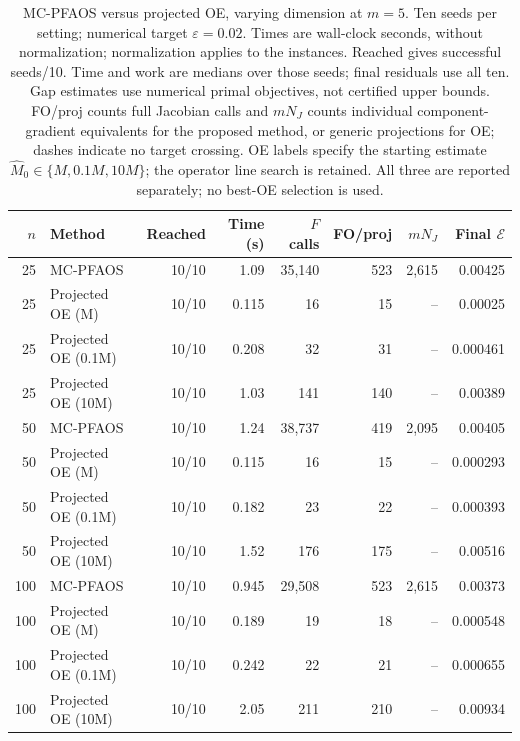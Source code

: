 \begin{table}[!htbp]
\centering\scriptsize
\caption{MC-PFAOS versus projected OE, varying dimension at $m=5$. Ten seeds per setting; numerical target $\varepsilon=0.02$. Times are wall-clock seconds, without normalization; normalization applies to the instances. Reached gives successful seeds/10. Time and work are medians over those seeds; final residuals use all ten. Gap estimates use numerical primal objectives, not certified upper bounds. FO/proj counts full Jacobian calls and $mN_J$ counts individual component-gradient equivalents for the proposed method, or generic projections for OE; dashes indicate no target crossing. OE labels specify the starting estimate $\widehat M_0\in\{M,0.1M,10M\}$; the operator line search is retained. All three are reported separately; no best-OE selection is used.}
\label{tab:mc_dimension_numerical}
\begin{tabular}{r l r r r r r r}
\hline
$n$ & Method & Reached & Time (s) & $F$ calls & FO/proj & $mN_J$ & Final $\mathcal E$ \\
\hline
25 & MC-PFAOS & 10/10 & 1.09 & 35,140 & 523 & 2,615 & 0.00425 \\
25 & Projected OE (M) & 10/10 & 0.115 & 16 & 15 & -- & 0.00025 \\
25 & Projected OE (0.1M) & 10/10 & 0.208 & 32 & 31 & -- & 0.000461 \\
25 & Projected OE (10M) & 10/10 & 1.03 & 141 & 140 & -- & 0.00389 \\
\hline
50 & MC-PFAOS & 10/10 & 1.24 & 38,737 & 419 & 2,095 & 0.00405 \\
50 & Projected OE (M) & 10/10 & 0.115 & 16 & 15 & -- & 0.000293 \\
50 & Projected OE (0.1M) & 10/10 & 0.182 & 23 & 22 & -- & 0.000393 \\
50 & Projected OE (10M) & 10/10 & 1.52 & 176 & 175 & -- & 0.00516 \\
\hline
100 & MC-PFAOS & 10/10 & 0.945 & 29,508 & 523 & 2,615 & 0.00373 \\
100 & Projected OE (M) & 10/10 & 0.189 & 19 & 18 & -- & 0.000548 \\
100 & Projected OE (0.1M) & 10/10 & 0.242 & 22 & 21 & -- & 0.000655 \\
100 & Projected OE (10M) & 10/10 & 2.05 & 211 & 210 & -- & 0.00934 \\
\hline
\end{tabular}
\end{table}
